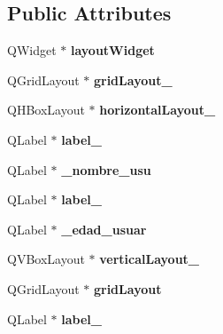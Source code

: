 \subsection*{Public Attributes}
\begin{DoxyCompactItemize}
\item 
\mbox{\label{class_ui__formulario_a75ba89549b5f4e6f4c0e7d2f4c19eea2}} 
Q\+Widget $\ast$ {\bfseries layout\+Widget}
\item 
\mbox{\label{class_ui__formulario_a2a6fe4ec3d434c62abbb678569a88deb}} 
Q\+Grid\+Layout $\ast$ {\bfseries grid\+Layout\+\_}
\item 
\mbox{\label{class_ui__formulario_a72a64b74e341e65235d607690dfa6afe}} 
Q\+H\+Box\+Layout $\ast$ {\bfseries horizontal\+Layout\+\_}
\item 
\mbox{\label{class_ui__formulario_a3a30b1eb5c25a6603bff1b13398b8fa9}} 
Q\+Label $\ast$ {\bfseries label\+\_}
\item 
\mbox{\label{class_ui__formulario_a30db5e6da62801b71cd8ba4cf74a34c4}} 
Q\+Label $\ast$ {\bfseries \+\_\+nombre\+\_\+usu}
\item 
\mbox{\label{class_ui__formulario_ac0710c15068d38e411a015b6e4436b0a}} 
Q\+Label $\ast$ {\bfseries label\+\_}
\item 
\mbox{\label{class_ui__formulario_a7af5440e70841968714bc22da8769192}} 
Q\+Label $\ast$ {\bfseries \+\_\+edad\+\_\+usuar}
\item 
\mbox{\label{class_ui__formulario_a97d8024ea627ecc71b1e1ab4e498c34b}} 
Q\+V\+Box\+Layout $\ast$ {\bfseries vertical\+Layout\+\_}
\item 
\mbox{\label{class_ui__formulario_a65dc56631147358bc3f8b383239c5279}} 
Q\+Grid\+Layout $\ast$ {\bfseries grid\+Layout}
\item 
\mbox{\label{class_ui__formulario_a882195e1cc65efbecd4a09a4a2c2f325}} 
Q\+Label $\ast$ {\bfseries label\+\_}

\end{DoxyCompactItemize}
